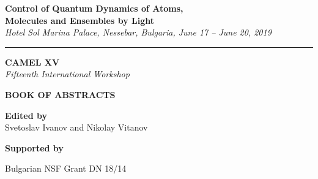 \thispagestyle{empty}



\begin{center}

{\LARGE \textsf{\textbf{Control of Quantum Dynamics of Atoms,}\\ \vspace{2mm} \textbf{Molecules and Ensembles by Light} }}\\ \vspace{2mm}
\begingroup
    \fontsize{15pt}{12pt}\selectfont
    \emph{Hotel Sol Marina Palace, Nessebar, Bulgaria, June 17 -- June 20, 2019}
\endgroup

\vspace{3mm}

\hrule

\vspace{25mm}

{\fontsize{40}{48}\selectfont \textsf{\textbf{CAMEL XV}}}\\
\vspace{5mm}
{\LARGE \emph{Fifteenth International Workshop}}\\

\vspace{30mm}

{\fontsize{36}{40}\selectfont \textsf{\textbf{BOOK OF  ABSTRACTS}}}\\

\vspace{20mm}

\Large{\textbf{Edited by} \\ Svetoslav Ivanov and Nikolay Vitanov}

\vspace{60mm}

{\Large \textbf{Supported by}

Bulgarian NSF Grant DN 18/14

}




\end{center}

